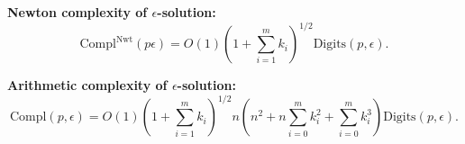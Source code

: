 \documentclass[11pt,a4paper]{article}
\begin{document}
\textbf{Newton complexity of $\epsilon$-solution:}
\[\text{Compl}^\text{Nwt}(p\epsilon) = O(1)\left(1+\sum_{i=1}^m k_i\right)^{1/2}\text{Digits}(p,\epsilon).\]

\textbf{Arithmetic complexity of $\epsilon$-solution:}
\[\text{Compl}(p,\epsilon) = O(1)\left(1+\sum_{i=1}^m k_i\right)^{1/2}n\left(n^2+n\sum_{i=0}^m k_i^2 +\sum_{i=0}^m k_i^3\right)\text{Digits}(p,\epsilon).\]

 

\nocite{*}
\end{document}
